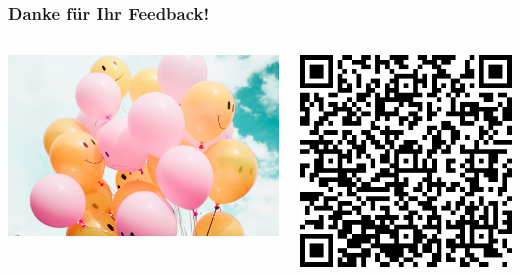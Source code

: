 \documentclass{beamer}
\begin{document}
\begin{frame}
\frametitle{Danke für Ihr Feedback!}

\begin{columns}[c]

\begin{column}{6cm}
\begin{center}
 \includegraphics[width=\textwidth]{smilie_balloons.jpg}
\end{center}

\end{column}

\begin{column}{4cm}


\begin{center}
\includegraphics[width=\textwidth]{feedback_QR.png}
\end{center}
\end{column}


\end{columns}

\end{frame}
\end{document}
